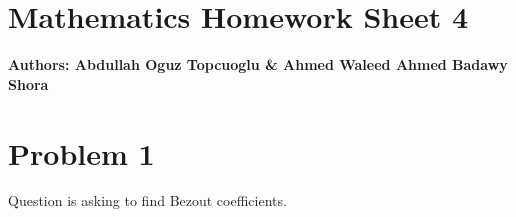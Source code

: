 \documentclass{article}
\begin{document}
\section*{\huge Mathematics Homework Sheet 4}
\begin{flushright}
   \textbf{Authors: Abdullah Oguz Topcuoglu \& Ahmed Waleed Ahmed Badawy Shora}
\end{flushright}


\section*{Problem 1}


Question is asking to find Bezout coefficients.
\end{document}
